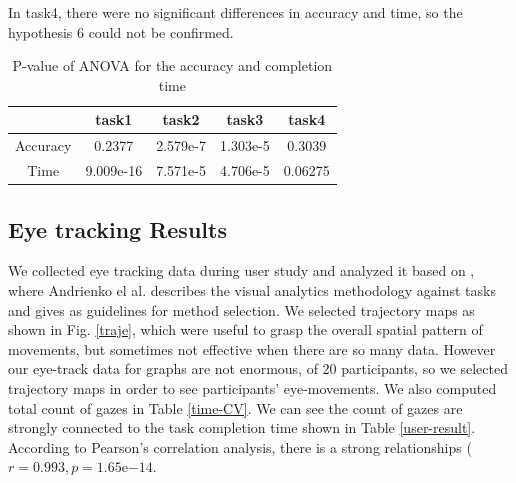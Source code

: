 \documentclass{llncs}
\begin{document}
In task4, there were no significant differences in accuracy and time, so the hypothesis 6 could not be confirmed.

\begin{table}[h]
  \begin{center}
    \begin{tabular}{|c||c|c|c|c|} \hline
      & task1 & task2 & task3 & task4 \\ \hline \hline
        Accuracy & 0.2377 & 2.579e-7 & 1.303e-5 & 0.3039 \\ \hline
        Time & 9.009e-16 & 7.571e-5 & 4.706e-5 & 0.06275\\ \hline
    \end{tabular}
  \end{center}
  \caption{P-value of ANOVA for the accuracy and completion time}
  \label{anova}
\end{table}

\subsection{Eye tracking Results}

We collected eye tracking data during user study and analyzed it based on \cite{eyemethod}, where Andrienko el al. describes the visual analytics methodology against tasks and gives as guidelines for method selection. 
We selected trajectory maps as shown in Fig. \ref{traje}, which were useful to grasp the overall spatial pattern of movements, but sometimes not effective when there are so many data.
However our eye-track data for graphs are not enormous, of 20 participants, so we selected trajectory maps in order to see participants' eye-movements.
We also computed total count of gazes in Table \ref{time-CV}. We can see the count of gazes are strongly connected to the task completion time shown in Table \ref{user-result}. According to Pearson's correlation analysis, there is a strong relationships ($r = 0.993, p = 1.65 \mathrm{e}{-14}$.
\end{document}
